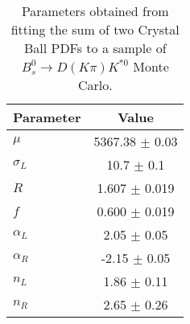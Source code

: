 \begin{table}[h]
  \centering
  \begin{tabular}{lc}
      \toprule
      Parameter & Value \\
      \midrule
      $\mu$ & 5367.38 $\pm$ 0.03 \\
      $\sigma_L$ & 10.7 $\pm$ 0.1 \\
      $R$ & 1.607 $\pm$ 0.019 \\
      $f$ & 0.600 $\pm$ 0.019 \\
      $\alpha_L$ & 2.05 $\pm$ 0.05 \\
      $\alpha_R$ & -2.15 $\pm$ 0.05 \\
      $n_L$ & 1.86 $\pm$ 0.11 \\
      $n_R$ & 2.65 $\pm$ 0.26 \\
  \bottomrule
  \end{tabular}
  \caption{Parameters obtained from fitting the sum of two Crystal Ball PDFs to a sample of $B^0_s \to D(K\pi)K^{*0}$ Monte Carlo.}
\label{tab:signal_Bs_MC_params}
\end{table}
